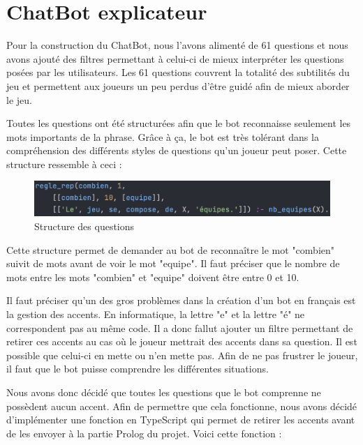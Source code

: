 \documentclass[a4paper, 11pt]{article}
\begin{document}
\newpage

\section{ChatBot explicateur}

Pour la construction du ChatBot, nous l'avons alimenté de 61 questions et nous avons ajouté des filtres permettant à celui-ci de mieux interpréter les questions posées par les utilisateurs. Les 61 questions couvrent la totalité des subtilités du jeu et permettent aux joueurs un peu perdus d'être guidé afin de mieux aborder le jeu.\newline

Toutes les questions ont été structurées afin que le bot reconnaisse seulement les mots importants de la phrase. Grâce à ça, le bot est très tolérant dans la compréhension des différents styles de questions qu'un joueur peut poser. Cette structure ressemble à ceci : 

\begin{figure}[!h]
	\centering
	\includegraphics[scale=.6]{assets/question-structure.png}
	\caption{Structure des questions}
\end{figure}

Cette structure permet de demander au bot de reconnaître le mot "combien" suivit de mots avant de voir le mot "equipe". Il faut préciser que le nombre de mots entre les mots "combien" et "equipe" doivent être entre 0 et 10.\newline

Il faut préciser qu'un des gros problèmes dans la création d'un bot en français est la gestion des accents. En informatique, la lettre "e" et la lettre "é" ne correspondent pas au même code. Il a donc fallut ajouter un filtre permettant de retirer ces accents au cas où le joueur mettrait des accents dans sa question. Il est possible que celui-ci en mette ou n'en mette pas. Afin de ne pas frustrer le joueur, il faut que le bot puisse comprendre les différentes situations.\newline

Nous avons donc décidé que toutes les questions que le bot comprenne ne possèdent aucun accent. Afin de permettre que cela fonctionne, nous avons décidé d'implémenter une fonction en TypeScript qui permet de retirer les accents avant de les envoyer à la partie Prolog du projet. Voici cette fonction :
\end{document}
